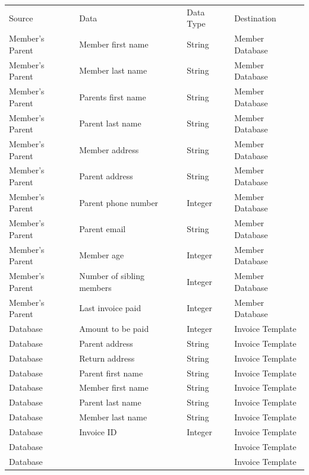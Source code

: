 \begin{table}[h]
\begin{tabular}{llll}
Source          & Data                      & Data Type & Destination     \\
Member's Parent & Member first name         & String    & Member Database \\
Member's Parent & Member last name          & String    & Member Database \\
Member's Parent & Parents first name        & String    & Member Database \\
Member's Parent & Parent last name          & String    & Member Database \\
Member's Parent & Member address            & String    & Member Database \\
Member's Parent & Parent address            & String    & Member Database \\
Member's Parent & Parent phone number       & Integer   & Member Database \\
Member's Parent & Parent email              & String    & Member Database \\
Member's Parent & Member age                & Integer   & Member Database \\
Member's Parent & Number of sibling members & Integer   & Member Database \\
Member's Parent & Last invoice paid         & Integer   & Member Database \\
Database        & Amount to be paid         & Integer   & Invoice Template \\
Database        & Parent address            & String    & Invoice Template \\
Database        & Return address            & String    & Invoice Template \\
Database        & Parent first name         & String    & Invoice Template \\
Database        & Member first name         & String    & Invoice Template \\
Database        & Parent last name          & String    & Invoice Template \\
Database        & Member last name          & String    & Invoice Template \\
Database        & Invoice ID                & Integer   & Invoice Template \\
Database        &                           &           & Invoice Template \\
Database        &                           &           & Invoice Template \\

\end{tabular}
\end{table}


